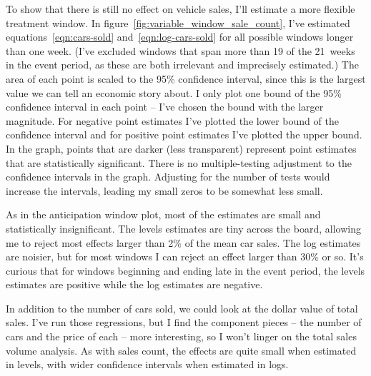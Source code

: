 \documentclass[11pt,letterpaper,oneside]{article}
\begin{document}
\begin{doublespacing}
To show that there is still no effect on vehicle sales, I'll estimate a more flexible treatment window.
In figure~\ref{fig:variable_window_sale_count}, I've estimated equations~\ref{eqn:cars-sold} and~\ref{eqn:log-cars-sold} for all possible windows longer than one week.
(I've excluded windows that span more than 19 of the 21~weeks in the event period, as these are both irrelevant and imprecisely estimated.)
The area of each point is scaled to the 95\% confidence interval, since this is the largest value we can tell an economic story about.
I only plot one bound of the 95\% confidence interval in each point -- I've chosen the bound with the larger magnitude.
For negative point estimates I've plotted the lower bound of the confidence interval and for positive point estimates I've plotted the upper bound.
In the graph, points that are darker (less transparent) represent point estimates that are statistically significant.
There is no multiple\hyp{}testing adjustment to the confidence intervals in the graph.
Adjusting for the number of tests would increase the intervals, leading my small zeros to be somewhat less small.

As in the anticipation window plot, most of the estimates are small and statistically insignificant.
The levels estimates are tiny across the board, allowing me to reject most effects larger than 2\% of the mean car sales.
The log estimates are noisier, but for most windows I can reject an effect larger than 30\% or so.
It's curious that for windows beginning and ending late in the event period, the levels estimates are positive while the log estimates are negative.

In addition to the number of cars sold, we could look at the dollar value of total sales.
I've run those regressions, but I find the component pieces -- the number of cars and the price of each -- more interesting, so I won't linger on the total sales volume analysis.
As with sales count, the effects are quite small when estimated in levels, with wider confidence intervals when estimated in logs.


\end{doublespacing}
\end{document}
